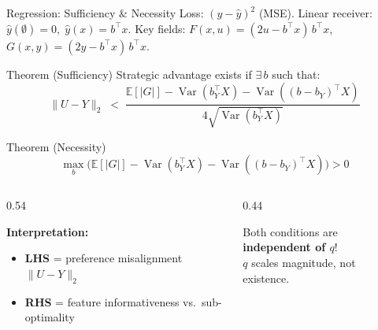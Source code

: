 \documentclass[aspectratio=169, 10pt]{beamer}
\newcommand{\E}{\mathbb{E}}
\DeclareMathOperator{\Var}{Var}
\begin{document}
\begin{frame}{Regression: Sufficiency \& Necessity}
  {\small Loss: $(y - \hat{y})^2$ (MSE).\; Linear receiver: $\hat{y}(\emptyset) = 0,\; \hat{y}(x) = b^\top x$.\; Key fields: $F(x,u) = (2u - b^\top x)\,b^\top x$,\; $G(x,y) = (2y - b^\top x)\,b^\top x$.}

  \vspace{4pt}
  \begin{alertblock}{Theorem (Sufficiency)}
    Strategic advantage exists if $\exists\, b$ such that:
    \vspace{-4pt}
    $$\|U{-}Y\|_2 \;<\; \frac{\E[|G|] - \Var(b_Y^\top X) - \Var((b{-}b_Y)^\top X)}{4\sqrt{\Var(b_Y^\top X)}}$$
    \vspace{-8pt}
  \end{alertblock}
  \vspace{-2pt}
  \begin{block}{Theorem (Necessity)}
    \vspace{-6pt}
    $$\max_b \Big(\E[|G|] - \Var(b_Y^\top X) - \Var((b{-}b_Y)^\top X)\Big) > 0$$
    \vspace{-8pt}
  \end{block}
  \vspace{4pt}
  \begin{columns}[T]
    \begin{column}{0.54\textwidth}
      {\small\textbf{Interpretation:}
      \begin{itemize}
        \item \textbf{LHS} = preference misalignment $\|U - Y\|_2$
        \item \textbf{RHS} = feature informativeness vs.\ sub-optimality
      \end{itemize}}
    \end{column}
    \begin{column}{0.44\textwidth}
      \begin{exampleblock}{}
        {\small Both conditions are \textbf{independent of $q$}!\\ $q$ scales magnitude, not existence.}
      \end{exampleblock}
    \end{column}
  \end{columns}
\end{frame}
\end{document}
